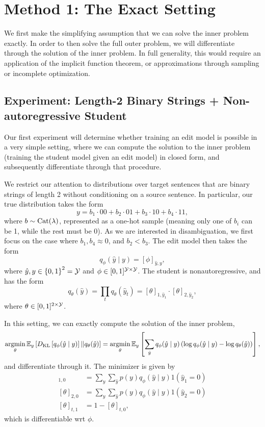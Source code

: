 \documentclass[11pt]{article}
\begin{document}
\section{Method 1: The Exact Setting}
We first make the simplifying assumption that we can solve the inner problem exactly.
In order to then solve the full outer problem, we will differentiate through the solution of the
inner problem.
In full generality, this would require an application of the implicit function theorem,
or approximations through sampling or incomplete optimization.

\subsection{Experiment: Length-2 Binary Strings + Non-autoregressive Student}
Our first experiment will determine whether training an edit model is possible in a
very simple setting, where we can compute the solution to the inner problem
(training the student model given an edit model) in closed form,
and subsequently differentiate through that procedure.

We restrict our attention to distributions over target sentences that are
binary strings of length 2 without conditioning on a source sentence.
In particular, our true distribution takes the form
$$y = b_1\cdot 00 + b_2\cdot 01 + b_3\cdot 10 + b_4\cdot 11,$$
where $b\sim\mathrm{Cat}(\lambda)$, represented as a one-hot sample
(meaning only one of $b_i$ can be 1, while the rest must be 0).
As we are interested in disambiguation, we first focus on the case where
$b_1, b_4 \approx 0$, and $b_2 < b_3$.
The edit model then takes the form
$$q_\phi(\hat{y} \mid y)= [\phi]_{\hat{y},y},$$
where $\hat{y},y \in \left\{0,1\right\}^2 = \mathcal{Y}$ and $\phi \in [0,1]^{\mathcal{Y}\times\mathcal{Y}}$.
The student is nonautoregressive, and has the form
$$q_\theta(\hat{y}) = \prod_t q_\theta(\hat{y}_t)
= [\theta]_{1,\hat{y}_1} \cdot [\theta]_{2,\hat{y}_2},$$
where $\theta\in[0,1]^{2\times\mathcal{Y}}$.

In this setting, we can exactly compute the solution of the inner problem,
$$
\operatorname*{argmin}_\theta \mathbb{E}_{y}\left[D_\mathrm{KL}\left[q_\phi(\hat{y} \mid y)\right] || q_\theta(\hat{y})\right]
= \operatorname*{argmin}_\theta \mathbb{E}_{y}\left[\sum_{\hat{y}} q_\phi(\hat{y} \mid y)
    \left(\log q_\phi(\hat{y} \mid y) - \log q_\theta(\hat{y})\right)
\right],
$$
and differentiate through it.
The minimizer is given by
\begin{align*}
    [\theta]_{1,0} &= \sum_y\sum_{\hat{y}} p(y)q_\phi(\hat{y}\mid y) 1(\hat{y}_1=0)\\
    [\theta]_{2,0} &= \sum_y\sum_{\hat{y}} p(y)q_\phi(\hat{y}\mid y) 1(\hat{y}_2=0)\\
    [\theta]_{t,1} &= 1 - [\theta]_{t,0},
\end{align*}
which is differentiable wrt $\phi$.
\end{document}
